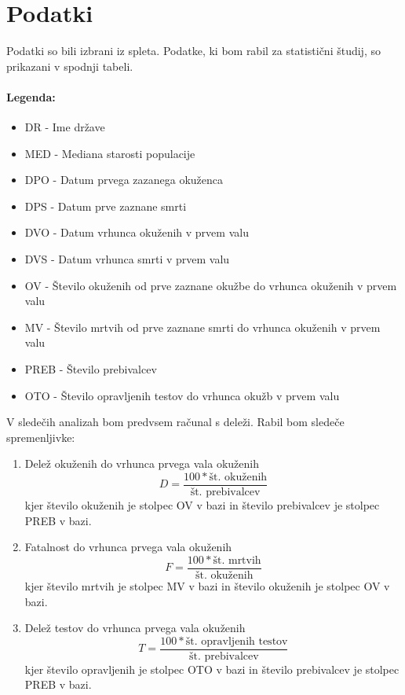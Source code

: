 \documentclass[a4paper,11pt]{article}
\begin{document}
\section{Podatki}
Podatki so bili izbrani iz spleta. Podatke, ki bom rabil za statistični študij, so prikazani v spodnji tabeli. \\
\begin{center}
\end{center}
\paragraph{Legenda:}

\begin{itemize}
\item{DR - Ime države}
\item{MED - Mediana starosti populacije}
\item{DPO - Datum prvega zazanega okuženca}
\item{DPS - Datum prve zaznane smrti}
\item{DVO - Datum vrhunca okuženih v prvem valu}
\item{DVS - Datum vrhunca smrti v prvem valu}
\item{OV - Število okuženih od prve zaznane okužbe do vrhunca okuženih v prvem valu}
\item{MV - Število mrtvih od prve zaznane smrti do vrhunca okuženih v prvem valu}
\item{PREB - Število prebivalcev}
\item{OTO - Število opravljenih testov do vrhunca okužb v prvem valu}
\end{itemize}

V sledečih analizah bom predvsem računal s deleži. Rabil bom sledeče spremenljivke:
\begin{enumerate}
\item{Delež okuženih do vrhunca prvega vala okuženih}
\[D = \frac{100 * \text{št. okuženih}}{\text{št. prebivalcev}}\]
kjer število okuženih je stolpec OV v bazi in število prebivalcev je stolpec PREB v bazi.

\item{Fatalnost do vrhunca prvega vala okuženih}
\[F = \frac{100 * \text{št. mrtvih}}{\text{št. okuženih}}\]
kjer število mrtvih je stolpec MV v bazi in število okuženih je stolpec OV v bazi.

\item{Delež testov do vrhunca prvega vala okuženih}
\[T = \frac{100 * \text{št. opravljenih testov}}{\text{št. prebivalcev}}\]
kjer število opravljenih je stolpec OTO v bazi in število prebivalcev je stolpec PREB v bazi.

\end{enumerate}
\end{document}
